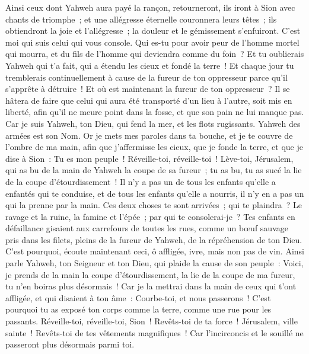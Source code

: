 \begin{multicols}{2}
Ainsi ceux dont Yahweh aura payé la rançon, retourneront, ils iront à Sion avec chants de triomphe~; et une allégresse éternelle couronnera leurs têtes~; ils obtiendront la joie et l'allégresse~; la douleur et le gémissement s'enfuiront.
C'est moi qui suis celui qui vous console. Qui es-tu pour avoir peur de l'homme mortel qui mourra, et du fils de l'homme qui deviendra comme du foin~?
Et tu oublierais Yahweh qui t'a fait, qui a étendu les cieux et fondé la terre~! Et chaque jour tu tremblerais continuellement à cause de la fureur de ton oppresseur parce qu'il s'apprête à détruire~! Et où est maintenant la fureur de ton oppresseur~?
Il se hâtera de faire que celui qui aura été transporté d'un lieu à l'autre, soit mis en liberté, afin qu'il ne meure point dans la fosse, et que son pain ne lui manque pas.
Car je suis Yahweh, ton Dieu, qui fend la mer, et les flots rugissants. Yahweh des armées est son Nom.
Or je mets mes paroles dans ta bouche, et je te couvre de l'ombre de ma main, afin que j'affermisse les cieux, que je fonde la terre, et que je dise à Sion~: Tu es mon peuple~!
Réveille-toi, réveille-toi~! Lève-toi, Jérusalem, qui as bu de la main de Yahweh la coupe de sa fureur~; tu as bu, tu as sucé la lie de la coupe d'étourdissement~!
Il n'y a pas un de tous les enfants qu'elle a enfantés qui te conduise, et de tous les enfants qu'elle a nourris, il n'y en a pas un qui la prenne par la main.
Ces deux choses te sont arrivées~; qui te plaindra~? Le ravage et la ruine, la famine et l'épée~; par qui te consolerai-je~?
Tes enfants en défaillance gisaient aux carrefours de toutes les rues, comme un bœuf sauvage pris dans les filets, pleins de la fureur de Yahweh, de la répréhension de ton Dieu.
C'est pourquoi, écoute maintenant ceci, ô affligée, ivre, mais non pas de vin.
Ainsi parle Yahweh, ton Seigneur et ton Dieu, qui plaide la cause de son peuple~: Voici, je prends de la main la coupe d'étourdissement, la lie de la coupe de ma fureur, tu n'en boiras plus désormais~!
Car je la mettrai dans la main de ceux qui t'ont affligée, et qui disaient à ton âme~: Courbe-toi, et nous passerons~! C'est pourquoi tu as exposé ton corps comme la terre, comme une rue pour les passants.
\VerseOne{}Réveille-toi, réveille-toi, Sion~! Revêts-toi de ta force~! Jérusalem, ville sainte~! Revêts-toi de tes vêtements magnifiques~! Car l'incirconcis et le souillé ne passeront plus désormais parmi toi. 

\end{multicols}
